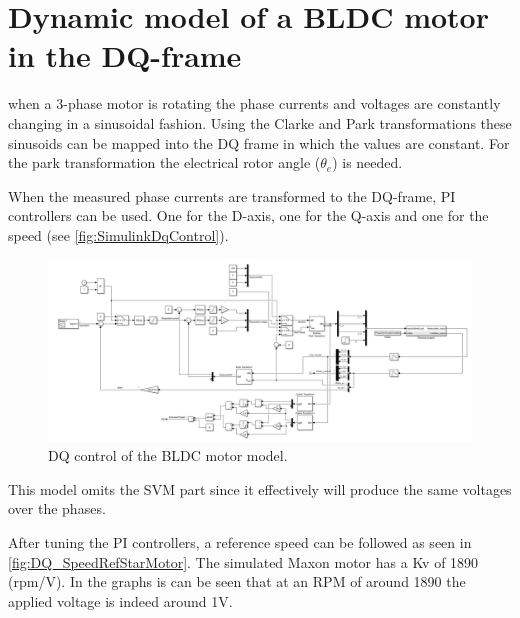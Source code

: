 \documentclass[]{report}
\begin{document}
\section{Dynamic model of a BLDC motor in the DQ-frame}
when a 3-phase motor is rotating the phase currents and voltages are constantly changing in a sinusoidal fashion. Using the Clarke and Park transformations these sinusoids can be mapped into the DQ frame in which the values are constant. For the park transformation the electrical rotor angle ($\theta_e$) is needed.

When the measured phase currents are transformed to the DQ-frame, PI controllers can be used. One for the D-axis, one for the Q-axis and one for the speed (see \autoref{fig:SimulinkDqControl}).

\begin{figure}[H]
	\centering
	\includegraphics[width=\textwidth]{Matlab/SimulinkNonlinearModelDQ_Control.JPG}
	\caption{DQ control of the BLDC motor model.}
	\label{fig:SimulinkDqControl}
\end{figure}

This model omits the SVM part since it effectively will produce the same voltages over the phases.

After tuning the PI controllers, a reference speed can be followed as seen in \autoref{fig:DQ_SpeedRefStarMotor}. The simulated Maxon motor \cite{Maxon_motor_EC_14} has a Kv of 1890 (rpm/V). In the graphs is can be seen that at an RPM of around 1890 the applied voltage is indeed around 1V.
\end{document}
